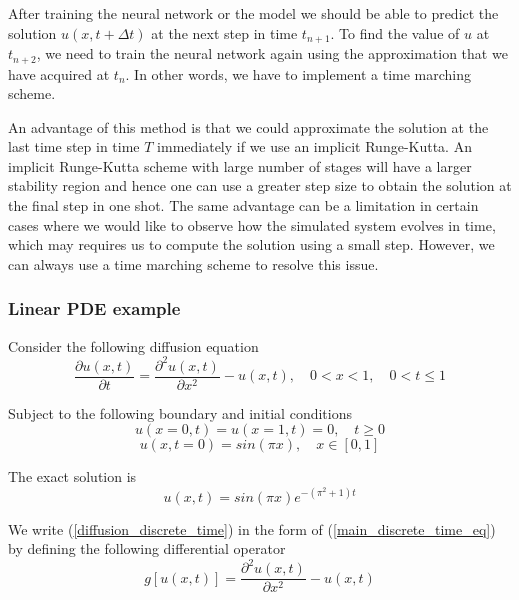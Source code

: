 \documentclass[a4paper,12pt]{article}
\theoremstyle{definition}
\begin{document}
After training the neural network or the model we should be able to predict the solution $u(x, t + \Delta t)$
at the next step in time $t_{n+1}$. To find the value of $u$ at $t_{n+2}$, we need to train the neural network
again using the approximation that we have acquired at $t_{n}$. In other words, we have to implement a time marching 
scheme. 

An advantage of this method is that we could approximate the solution at the last time step in time $T$ immediately
if we use an implicit Runge-Kutta. An implicit Runge-Kutta scheme with large number of stages will have a larger 
stability region and hence one can use a greater step size to obtain the solution at the final step in one shot. 
The same advantage can be a limitation in certain cases where we would like to observe how the simulated system 
evolves in time, which may requires us to compute the solution using a small step.
However, we can always use a time marching scheme to resolve this issue.

\subsubsection{Linear PDE example}
Consider the following diffusion equation 
\begin{equation}\label{diffusion_discrete_time}
\frac{\partial u(x,t)}{\partial t} = \frac{\partial^2 u(x,t)}{\partial x^2} - u(x, t),
\quad 0 < x < 1, \quad 0 < t  \le 1
\end{equation}

Subject to the following boundary and initial conditions
\begin{equation}
u(x = 0, t) = u(x= 1, t) = 0, \quad t \ge 0
\end{equation}
\begin{equation}
u(x, t=0) = sin(\pi x), \quad x \in [0, 1] 
\end{equation}

The exact solution is 
\begin{equation}
u(x,t) = sin(\pi x) e^{-(\pi^2 + 1)t}
\end{equation}

We write (\ref{diffusion_discrete_time}) in the form of (\ref{main_discrete_time_eq}) 
by defining the following differential operator
\begin{equation}
g[u(x,t)] = \frac{\partial^2 u(x,t)}{\partial x^2} - u(x, t)
\end{equation}
\end{document}
